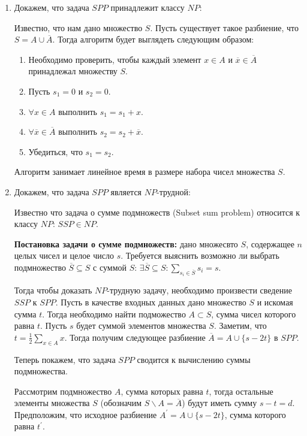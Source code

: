 \documentclass[bachelor, och, labwork]{shiza}
\begin{document}
  \begin{enumerate}
    \item Докажем, что задача $SPP$ принадлежит классу $NP$:
    
    Известно, что нам дано множество $S$. Пусть существует такое разбиение, что $S = A \cup \overline{A}$. Тогда алгоритм будет 
    выглядеть следующим образом:

    \begin{enumerate}
      \item Необходимо проверить, чтобы каждый элемент $x \in A$ и $\overline{x} \in \overline{A}$ принадлежал множеству $S$.
      \item Пусть $s_1 = 0$ и $s_2 = 0$.
      \item $\forall x \in A$ выполнить $s_1 = s_1 + x$.
      \item $\forall \overline{x} \in \overline{A}$ выполнить $s_2 = s_2 + \overline{x}$.
      \item Убедиться, что $s_1 = s_2$.
    \end{enumerate}

    Алгоритм занимает линейное время в размере набора чисел множества $S$.
    
    \item Докажем, что задача $SPP$ является $NP$-трудной:
    
    Известно что задача о сумме подмножеств (Subset sum problem) относится к классу $NP$: $SSP \in NP$.
    
    \textbf{Постановка задачи о сумме подмножеств:} дано множесвто $S$, содержащее $n$ целых чисел и целое число $s$.
    Требуется выяснить возможно ли выбрать подмножество $\overline{S} \subseteq S$ с суммой 
    $S$: $\exists \overline{S} \subseteq S: \sum_{s_i \in \overline{S}}s_i = s$.
  
    Тогда чтобы доказать $NP$-трудную задачу, необходимо произвести сведение $SSP$ к $SPP$. 
    Пусть в качестве входных данных дано множество $S$ и искомая сумма $t$. Тогда необходимо найти подможество $A \subset S$, сумма
    чисел которого равна $t$. Пусть $s$ будет суммой элементов множества $S$. Заметим, что $t = \frac{1}{2} \sum_{x \in A}x$.
    Тогда получим следующее разбиение $\overline{A} = A \cup \{s - 2t\}$ в $SPP$.

    Теперь покажем, что задача $SPP$ сводится к вычислению суммы подмножества.

    Рассмотрим подмножество $A$, сумма которых равна $t$, тогда остальные элементы множества $S$ (обозначим $S \backslash A = \overline{A}$) будут
    иметь сумму $s - t = d$. Предположим, что исходное разбиение $A^{'} = A \cup \{s - 2t\}$, сумма которого равна $t^{'}$.


\end{enumerate}
\end{document}

